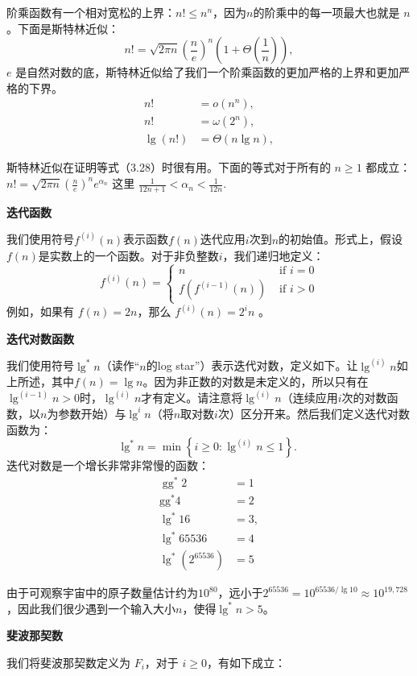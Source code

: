 \documentclass[lang=cn,newtx,10pt,scheme=chinese]{elegantbook}
\begin{document}
阶乘函数有一个相对宽松的上界：$n ! \leq n^n$，因为$n$的阶乘中的每一项最大也就是 $n$。下面是斯特林近似：
$$
n !=\sqrt{2 \pi n}\left(\frac{n}{e}\right)^n\left(1+\Theta\left(\frac{1}{n}\right)\right),
$$
$e$ 是自然对数的底，斯特林近似给了我们一个阶乘函数的更加严格的上界和更加严格的下界。
$$
\begin{aligned}
n ! & =o\left(n^n\right), \\
n ! & =\omega\left(2^n\right), \\
\lg (n !) & =\Theta(n \lg n),
\end{aligned}
$$

斯特林近似在证明等式（3.28）时很有用。下面的等式对于所有的 $n \geq 1$ 都成立：
$n !=\sqrt{2 \pi n}\left(\frac{n}{e}\right)^n e^{\alpha_n}$
这里
$\frac{1}{12 n+1}<\alpha_n<\frac{1}{12 n}$.

\textbf{迭代函数}

我们使用符号$f^{(i)}(n)$表示函数$f(n)$迭代应用$i$次到$n$的初始值。形式上，假设$f(n)$是实数上的一个函数。对于非负整数$i$，我们递归地定义：
$$
f^{(i)}(n)= \begin{cases}n & \text { if } i=0 \\ f\left(f^{(i-1)}(n)\right) & \text { if } i>0\end{cases}
$$
例如，如果有 $f(n)=2 n$，那么 $f^{(i)}(n)=2^i n$ 。

\textbf{迭代对数函数}

我们使用符号$\lg ^* n$（读作“$n$的log star”）表示迭代对数，定义如下。让$\lg ^{(i)} n$如上所述，其中$f(n)=\lg n$。因为非正数的对数是未定义的，所以只有在$\lg ^{(i-1)} n>0$时，$\lg ^{(i)} n$才有定义。请注意将$\lg ^{(i)} n$（连续应用$i$次的对数函数，以$n$为参数开始）与$\lg ^i n$（将$n$取对数$i$次）区分开来。然后我们定义迭代对数函数为：
$$
\lg ^* n=\min \left\{i \geq 0: \lg ^{(i)} n \leq 1\right\} \text {. }
$$
迭代对数是一个增长非常非常慢的函数：
$$
\begin{aligned}
\operatorname{gg}^* 2 & =1 \\
\mathrm{gg}^* 4 & =2 \\
\lg ^* 16 & =3, \\
\lg ^* 65536 & =4 \\
\lg ^*\left(2^{65536}\right) & =5
\end{aligned}
$$

由于可观察宇宙中的原子数量估计约为$10^{80}$，远小于$2^{65536}=10^{65536 / \lg 10} \approx 10^{19,728}$，因此我们很少遇到一个输入大小$n$，使得$\lg ^* n>5$。

\textbf{斐波那契数}

我们将斐波那契数定义为 $F_i$，对于 $i \geq 0$，有如下成立：
\end{document}
